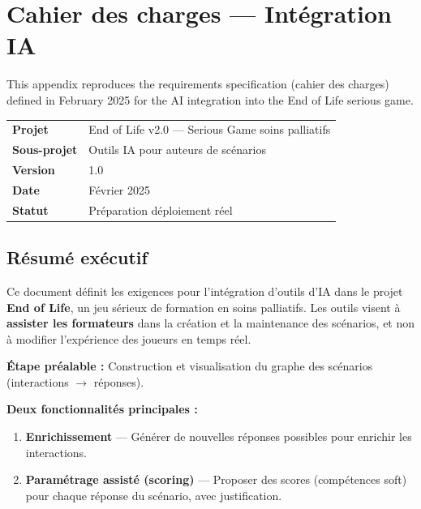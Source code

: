 \chapter{Cahier des charges --- Int\'egration IA}
\label{annexe:cdc}
\renewcommand{\thepage}{\thechapter-\arabic{page}}

This appendix reproduces the requirements specification (cahier des charges) defined in February 2025 for the AI integration into the End of Life serious game.

\begin{table}[!htbp]
\centering
\begin{tabular}{l l}
\toprule
\textbf{Projet} & End of Life v2.0 --- Serious Game soins palliatifs \\
\textbf{Sous-projet} & Outils IA pour auteurs de sc\'enarios \\
\textbf{Version} & 1.0 \\
\textbf{Date} & F\'evrier 2025 \\
\textbf{Statut} & Pr\'eparation d\'eploiement r\'eel \\
\bottomrule
\end{tabular}
\end{table}

\section{R\'esum\'e ex\'ecutif}

Ce document d\'efinit les exigences pour l'int\'egration d'outils d'IA dans le projet \textbf{End of Life}, un jeu s\'erieux de formation en soins palliatifs. Les outils visent \`a \textbf{assister les formateurs} dans la cr\'eation et la maintenance des sc\'enarios, et non \`a modifier l'exp\'erience des joueurs en temps r\'eel.

\textbf{\'Etape pr\'ealable :} Construction et visualisation du graphe des sc\'enarios (interactions $\rightarrow$ r\'eponses).

\textbf{Deux fonctionnalit\'es principales :}
\begin{enumerate}
    \item \textbf{Enrichissement} --- G\'en\'erer de nouvelles r\'eponses possibles pour enrichir les interactions.
    \item \textbf{Param\'etrage assist\'e (scoring)} --- Proposer des scores (comp\'etences soft) pour chaque r\'eponse du sc\'enario, avec justification.
\end{enumerate}


